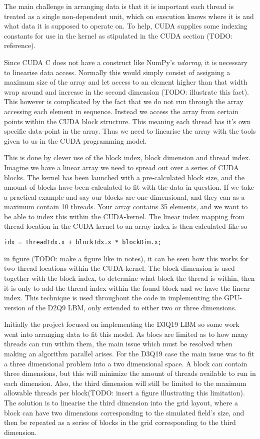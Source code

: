 The main challenge in arranging data is that it is important each thread is treated as a single non-dependent unit, which on execution knows where it is and what data it is supposed to operate on. To help, CUDA supplies some indexing constants for use in the kernel as stipulated in the CUDA section (TODO: reference).

Since CUDA C does not have a construct like NumPy's \textit{ndarray}, it is necessary to linearise data access. Normally this would simply consist of assigning a maximum size of the array and let access to an element higher than that width wrap around and increase in the second dimension (TODO: illustrate this fact). This however is complicated by the fact that we do not run through the array accessing each element in sequence. Instead we access the array from certain points within the CUDA block structure. This meaning each thread has it's own specific data-point in the array. Thus we need to linearise the array with the tools given to us in the CUDA programming model.

This is done by clever use of the block index, block dimension and thread index. Imagine we have a linear array we need to spread out over a series of CUDA blocks. The kernel has been launched with a pre-calculated block size, and the amount of blocks have been calculated to fit with the data in question. If we take a practical example and say our blocks are one-dimensional, and they can as a maximum contain 10 threads. Your array contains 35 elements, and we want to be able to index this within the CUDA-kernel. The linear index mapping from thread location in the CUDA kernel to an array index is then calculated like so

\begin{verbatim}
idx = threadIdx.x + blockIdx.x * blockDim.x;
\end{verbatim}

in figure (TODO: make a figure like in notes), it can be seen how this works for two thread locations within the CUDA-kernel. The block dimension is used together with the block index, to determine what block the thread is within, then it is only to add the thread index within the found block and we have the linear index. This technique is used throughout the code in implementing the GPU-version of the D2Q9 LBM, only extended to either two or three dimensions.

Initially the project focused on implementing the D3Q19 LBM so some work went into arranging data to fit this model. As blocs are limited as to how many threads can run within them, the main issue which must be resolved when making an algorithm parallel arises. For the D3Q19 case the main issue was to fit a three dimensional problem into a two dimensional space. A block can contain three dimensions, but this will minimize the amount of threads available to run in each dimension. Also, the third dimension will still be limited to the maximum allowable threads per block(TODO: insert a figure illustrating this limitation). The solution is to linearise the third dimension into the grid layout, where a block can have two dimensions corresponding to the simulated field's size, and then be repeated as a series of blocks in the grid corresponding to the third dimension.

